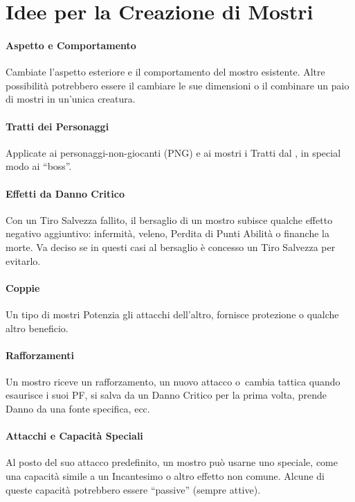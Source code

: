\documentclass[itdr]{subfiles}
\begin{document}
\section{Idee per la Creazione di Mostri}

\paragraph{Aspetto e Comportamento}
Cambiate l'aspetto esteriore e il comportamento del mostro esistente. Altre possibilità potrebbero essere il cambiare le sue dimensioni o il combinare un paio di mostri in un'unica creatura.

\vfill
\paragraph{Tratti dei Personaggi}
Applicate ai personaggi-non-giocanti (PNG) e ai mostri i Tratti dal \textbf{}, in special modo ai ``boss''.

\vfill
\paragraph{Effetti da Danno Critico}
Con un Tiro Salvezza fallito, il bersaglio di un mostro subisce qualche effetto negativo aggiuntivo: infermità, veleno, Perdita di Punti Abilità o finanche la morte. Va deciso se in questi casi al bersaglio è concesso un Tiro Salvezza per evitarlo.

\vfill
\paragraph{Coppie}
Un tipo di mostri Potenzia gli attacchi dell'altro, fornisce protezione o qualche altro beneficio.

\vfill
\paragraph{Rafforzamenti}
Un mostro riceve un rafforzamento, un nuovo attacco o~cambia tattica quando esaurisce i suoi PF, si salva da un Danno Critico per la prima volta, prende Danno da una fonte specifica, ecc.

\vfill
\paragraph{Attacchi e Capacità Speciali}
Al posto del suo attacco predefinito, un mostro può usarne uno speciale, come una capacità simile a un Incantesimo o altro effetto non comune. Alcune di queste capacità potrebbero essere ``passive'' (sempre attive).
\end{document}
